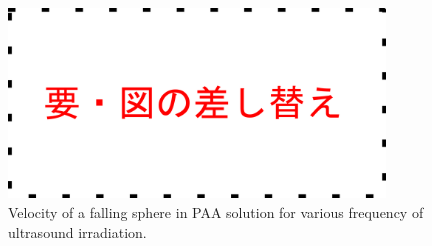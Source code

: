 \begin{figure}[h]
    \centering
    \includegraphics[width=10cm,clip]{tmp.png}
    \caption{Velocity of a falling sphere in PAA solution for various frequency of
        ultrasound irradiation.}
    \label{fig:PAA-falling}
\end{figure}